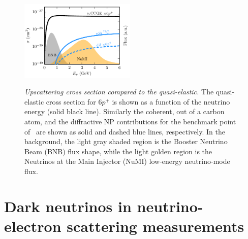 %
\begin{figure}[t!]
    \centering
    \includegraphics[width=0.49\textwidth]{cross_sections.pdf}
    \caption[Upscattering total cross section.]{{\textit{Upscattering cross section compared to the quasi-elastic.}} The quasi-elastic cross section for $6p^+$ is shown as a function of the neutrino energy (solid black line). Similarly the coherent, out of a carbon atom, and the diffractive NP contributions for the benchmark point of~\cite{Bertuzzo:2018itn} are shown as solid and dashed blue lines, respectively. In the background, the light gray shaded region is the Booster Neutrino Beam (BNB) flux shape, while the light golden region is the Neutrinos at the Main Injector (NuMI) low-energy neutrino-mode flux.}{\label{fig:cross_section}}
\end{figure}

\section{Dark neutrinos in neutrino-electron scattering measurements }

